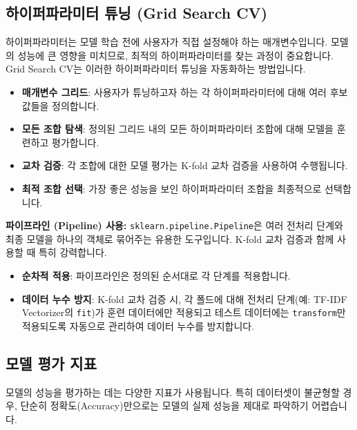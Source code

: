 \documentclass[11pt,a4paper]{article}
\theoremstyle{definition}
\begin{document}
\subsection{하이퍼파라미터 튜닝 (Grid Search CV)}

하이퍼파라미터는 모델 학습 전에 사용자가 직접 설정해야 하는 매개변수입니다. 모델의 성능에 큰 영향을 미치므로, 최적의 하이퍼파라미터를 찾는 과정이 중요합니다. Grid Search CV는 이러한 하이퍼파라미터 튜닝을 자동화하는 방법입니다.

\begin{infobox}[title={Grid Search CV의 작동 원리}]
\begin{itemize}
    \item \textbf{매개변수 그리드}: 사용자가 튜닝하고자 하는 각 하이퍼파라미터에 대해 여러 후보 값들을 정의합니다.
    \item \textbf{모든 조합 탐색}: 정의된 그리드 내의 모든 하이퍼파라미터 조합에 대해 모델을 훈련하고 평가합니다.
    \item \textbf{교차 검증}: 각 조합에 대한 모델 평가는 K-fold 교차 검증을 사용하여 수행됩니다.
    \item \textbf{최적 조합 선택}: 가장 좋은 성능을 보인 하이퍼파라미터 조합을 최종적으로 선택합니다.
\end{itemize}
\end{infobox}

\textbf{파이프라인 (Pipeline) 사용:}
\texttt{sklearn.pipeline.Pipeline}은 여러 전처리 단계와 최종 모델을 하나의 객체로 묶어주는 유용한 도구입니다. K-fold 교차 검증과 함께 사용할 때 특히 강력합니다.
\begin{itemize}
    \item \textbf{순차적 적용}: 파이프라인은 정의된 순서대로 각 단계를 적용합니다.
    \item \textbf{데이터 누수 방지}: K-fold 교차 검증 시, 각 폴드에 대해 전처리 단계(예: TF-IDF Vectorizer의 \texttt{fit})가 훈련 데이터에만 적용되고 테스트 데이터에는 \texttt{transform}만 적용되도록 자동으로 관리하여 데이터 누수를 방지합니다.
\end{itemize}

\subsection{모델 평가 지표}

모델의 성능을 평가하는 데는 다양한 지표가 사용됩니다. 특히 데이터셋이 불균형할 경우, 단순히 정확도(Accuracy)만으로는 모델의 실제 성능을 제대로 파악하기 어렵습니다.
\end{document}
